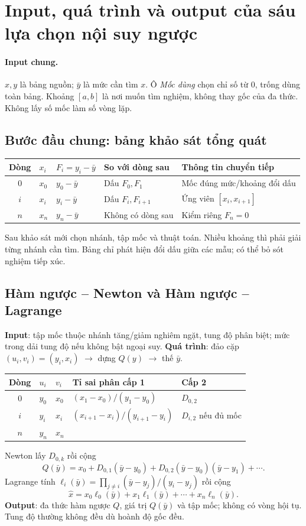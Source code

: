 \section{Input, quá trình và output của sáu lựa chọn nội suy ngược}

\paragraph{Input chung.} $x,y$ là bảng nguồn; $\bar y$ là mức cần tìm $x$. Ô \emph{Mốc dùng} chọn chỉ số từ 0, trống dùng toàn bảng. Khoảng $[a,b]$ là nơi muốn tìm nghiệm, không thay gốc của đa thức. Không lấy số mốc làm số vòng lặp.

\subsection{Bước đầu chung: bảng khảo sát tổng quát}
\begin{center}\small\begin{tabular}{cllll}\toprule
Dòng&$x_i$&$F_i=y_i-\bar y$&So với dòng sau&Thông tin chuyển tiếp\\\midrule
0&$x_0$&$y_0-\bar y$&Dấu $F_0,F_1$&Mốc đúng mức/khoảng đổi dấu\\
$i$&$x_i$&$y_i-\bar y$&Dấu $F_i,F_{i+1}$&Ứng viên $[x_i,x_{i+1}]$\\
$n$&$x_n$&$y_n-\bar y$&Không có dòng sau&Kiểm riêng $F_n=0$\\\bottomrule
\end{tabular}\end{center}
Sau khảo sát mới chọn nhánh, tập mốc và thuật toán. Nhiều khoảng thì phải giải từng nhánh cần tìm. Bảng chỉ phát hiện đổi dấu giữa các mẫu; có thể bỏ sót nghiệm tiếp xúc.

\subsection{Hàm ngược -- Newton và Hàm ngược -- Lagrange}
\textbf{Input}: tập mốc thuộc nhánh tăng/giảm nghiêm ngặt, tung độ phân biệt; mức trong dải tung độ nếu không bật ngoại suy. \textbf{Quá trình}: đảo cặp $(u_i,v_i)=(y_i,x_i)$ $\to$ dựng $Q(y)$ $\to$ thế $\bar y$.
\begin{center}\small\begin{tabular}{cllll}\toprule
Dòng&$u_i$&$v_i$&Tỉ sai phân cấp 1&Cấp 2\\\midrule
0&$y_0$&$x_0$&$(x_1-x_0)/(y_1-y_0)$&$D_{0,2}$\\
$i$&$y_i$&$x_i$&$(x_{i+1}-x_i)/(y_{i+1}-y_i)$&$D_{i,2}$ nếu đủ mốc\\
$n$&$y_n$&$x_n$&&\\\bottomrule
\end{tabular}\end{center}
Newton lấy $D_{0,k}$ rồi cộng
\[
Q(\bar y)=x_0+D_{0,1}(\bar y-y_0)+D_{0,2}(\bar y-y_0)(\bar y-y_1)+\cdots.
\]
Lagrange tính $\ell_i(\bar y)=\prod_{j\ne i}(\bar y-y_j)/(y_i-y_j)$ rồi cộng
\[
\widehat x=x_0\ell_0(\bar y)+x_1\ell_1(\bar y)+\cdots+x_n\ell_n(\bar y).
\]
\textbf{Output}: đa thức hàm ngược $Q$, giá trị $Q(\bar y)$ và tập mốc; không có vòng hội tụ. Tung độ thường không đều dù hoành độ gốc đều.

